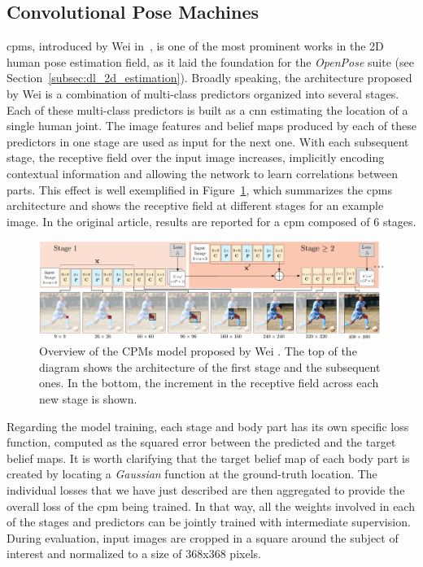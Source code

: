 \subsection{Convolutional Pose Machines}\label{subsec:cmps}
\glspl{cpm}, introduced by Wei \etal in~\cite{Wei2016-rb}, is one of the most prominent works in the 2D human pose estimation field, as it laid the foundation for the \emph{OpenPose} suite (see Section~\ref{subsec:dl_2d_estimation}). Broadly speaking, the architecture proposed by Wei \etal is a combination of multi-class predictors organized into several stages. Each of these multi-class predictors is built as a \gls{cnn} estimating the location of a single human joint. The image features and belief maps produced by each of these predictors in one stage are used as input for the next one. With each subsequent stage, the receptive field over the input image increases, implicitly encoding contextual information and allowing the network to learn correlations between parts. This effect is well exemplified in Figure~\ref{fig:cpms}, which summarizes the \glspl{cpm} architecture and shows the receptive field at different stages for an example image. In the original article, results are reported for a \gls{cpm} composed of 6 stages.

\begin{figure}[h]
    \centering
    \includegraphics[width=\textwidth]{figures/cpms.png}
    \caption{Overview of the CPMs model proposed by Wei \etal\cite{Wei2016-rb}. The top of the diagram shows the architecture of the first stage and the subsequent ones. In the bottom, the increment in the receptive field across each new stage is shown.}
    \label{fig:cpms}
\end{figure}

Regarding the model training, each stage and body part has its own specific loss function, computed as the squared error between the predicted and the target belief maps. It is worth clarifying that the target belief map of each body part is created by locating a \emph{Gaussian} function at the ground-truth location. The individual losses that we have just described are then aggregated to provide the overall loss of the \gls{cpm} being trained. In that way, all the weights involved in each of the stages and predictors can be jointly trained with intermediate supervision. During evaluation, input images are cropped in a square around the subject of interest and normalized to a size of 368x368 pixels.

